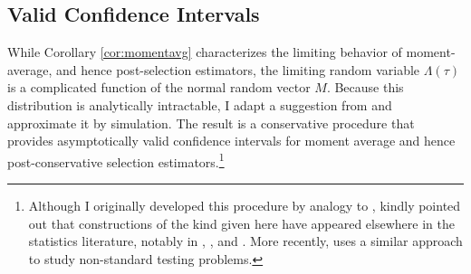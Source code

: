 
\subsection{Valid Confidence Intervals}
While Corollary \ref{cor:momentavg} characterizes the limiting behavior of moment-average, and hence post-selection estimators, the limiting random variable $\Lambda(\tau)$ is a complicated function of the normal random vector $M$. 
Because this distribution is analytically intractable, I adapt a suggestion from \cite{ClaeskensHjortbook} and approximate it by simulation.
The result is a conservative procedure that provides asymptotically valid confidence intervals for moment average and hence post-conservative selection estimators.\footnote{Although I originally developed this procedure by analogy to \cite{ClaeskensHjortbook}, \cite{Leeb} kindly pointed out that constructions of the kind given here have appeared elsewhere in the statistics literature, notably in \cite{Loh1985}, \cite{Berger1994}, and \cite{Silvapulle1996}. 
More recently, \cite{McCloskey} uses a similar approach to study non-standard testing problems.}
 
